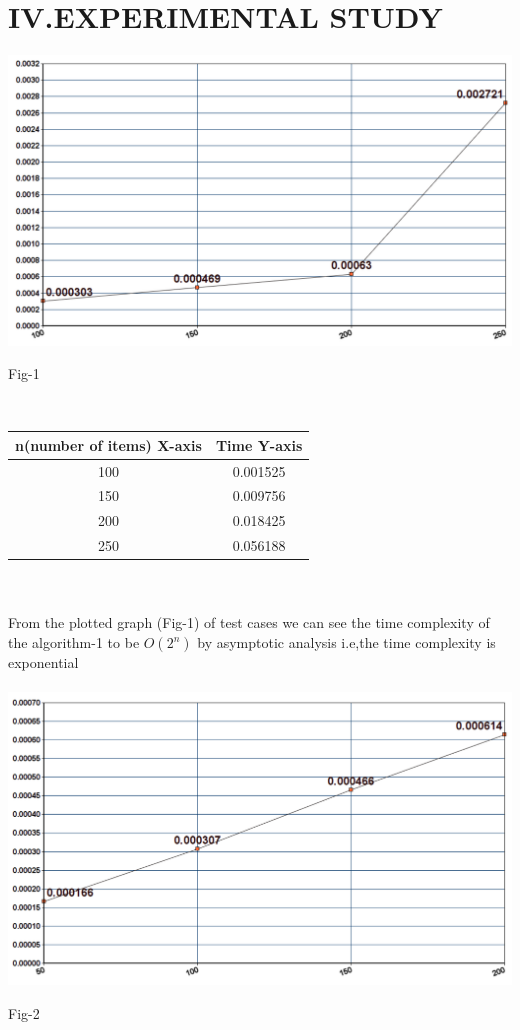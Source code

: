 \documentclass[twocolumn]{article}
\begin{document}
\section*{IV.EXPERIMENTAL STUDY
}
\includegraphics[width=.45\textwidth]{expo1.png}
\\
\centerline{Fig-1}\\
\begin{center}
	\begin{tabular}{ |c | c | }
	\hline
	
n(number of items)
X-axis
&
Time
Y-axis




 \\
	 \hline

100&
0.001525

\\
	\hline


150

&
0.009756

\\
\hline

200&
0.018425

\\
\hline

250&
0.056188

\\
\hline
	\end{tabular}
\end{center}
\\
\\
From the plotted graph (Fig-1) of test cases  we can see the time complexity of the algorithm-1 to be $O(2^n)$ by asymptotic analysis i.e,the time complexity is exponential 
\\
\\
\includegraphics[width=.45\textwidth]{line2.png}
\centerline{Fig-2}
\end{document}
